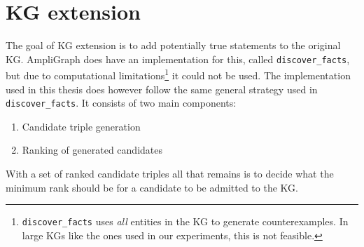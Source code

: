 

\newpage

\section{KG extension}

The goal of KG extension is to add potentially true statements to the original KG. AmpliGraph does have an implementation for this, called \texttt{discover\_facts}, but due to computational limitations\footnote{\texttt{discover\_facts} uses \textit{all} entities in the KG to generate counterexamples. In large KGs like the ones used in our experiments, this is not feasible.} it could not be used.
The implementation used in this thesis does however follow the same general strategy used in \texttt{discover\_facts}. It consists of two main components:
\begin{enumerate}
    \item Candidate triple generation
    \item Ranking of generated candidates
\end{enumerate}
With a set of ranked candidate triples all that remains is to decide what the minimum rank should be for a candidate to be admitted to the KG.


